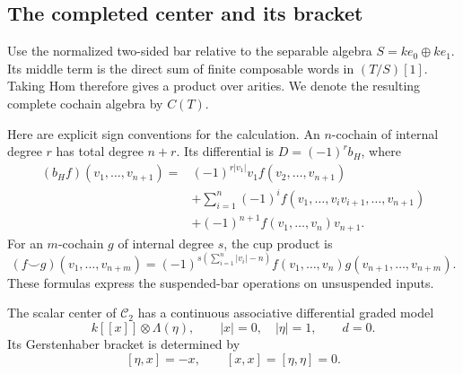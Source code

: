\subsection{The completed center and its bracket}
\label{v4-arith:centers:subsec:logarithmic}

Use the normalized two-sided bar relative to the separable
algebra $S=ke_0\oplus ke_1$. Its middle term is the direct
sum of finite composable words in $(T/S)[1]$. Taking Hom
therefore gives a product over arities. We denote the
resulting complete cochain algebra by $C(T)$.

Here are explicit sign conventions for the calculation.
An $n$-cochain of internal degree $r$ has total degree
$n+r$. Its differential is $D=(-1)^r b_H$, where
\[
\begin{split}
(b_Hf)(v_1,\ldots,v_{n+1})={}&
 (-1)^{r|v_1|}v_1f(v_2,\ldots,v_{n+1})\\
&+\sum_{i=1}^n(-1)^i
 f(v_1,\ldots,v_iv_{i+1},\ldots,v_{n+1})\\
&+(-1)^{n+1}f(v_1,\ldots,v_n)v_{n+1}.
\end{split}
\]
For an $m$-cochain $g$ of internal degree $s$, the cup
product is
\[
 (f\smile g)(v_1,\ldots,v_{n+m})
 =
 (-1)^{s(\sum_{i=1}^n|v_i|-n)}
 f(v_1,\ldots,v_n)g(v_{n+1},\ldots,v_{n+m}).
\]
These formulas express the suspended-bar operations on
unsuspended inputs.

\begin{theorem}\label{v4-arith:centers:thm:normal-center}
The scalar center of $\mathcal C_2$ has a continuous
associative differential graded model
\[
 k[[x]]\otimes\Lambda(\eta),\qquad |x|=0,\quad|\eta|=1,
 \qquad d=0.
\]
Its Gerstenhaber bracket is determined by
\[
 [\eta,x]=-x,\qquad [x,x]=[\eta,\eta]=0.
\]
\end{theorem}

